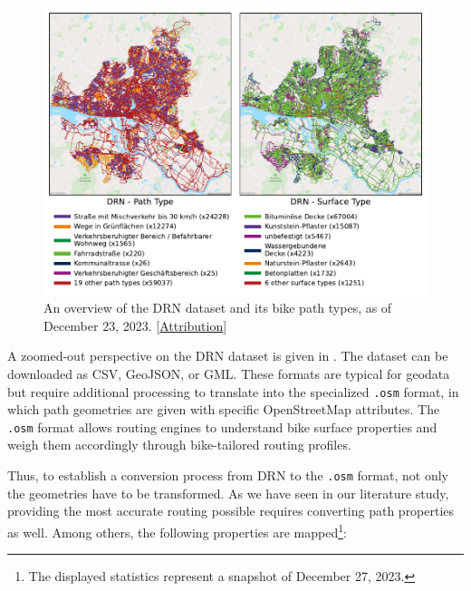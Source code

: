 \begin{figure}[t]
\centering
\includegraphics[width=\linewidth]{images/routing-drn.pdf}
\caption{An overview of the DRN dataset and its bike path types, as of December 23, 2023. [\hyperref[attribution]{Attribution}]}
\label{fig:drn-map}
\end{figure}

A zoomed-out perspective on the DRN dataset is given in . The dataset can be downloaded as CSV, GeoJSON, or GML. These formats are typical for geodata but require additional processing to translate into the specialized \texttt{.osm} format, in which path geometries are given with specific OpenStreetMap attributes. The \texttt{.osm} format allows routing engines to understand bike surface properties and weigh them accordingly through bike-tailored routing profiles.  

Thus, to establish a conversion process from DRN to the \texttt{.osm} format, not only the geometries have to be transformed. As we have seen in our literature study, providing the most accurate routing possible requires converting path properties as well. Among others, the following properties are mapped\footnote{The displayed statistics represent a snapshot of December 27, 2023.}:

